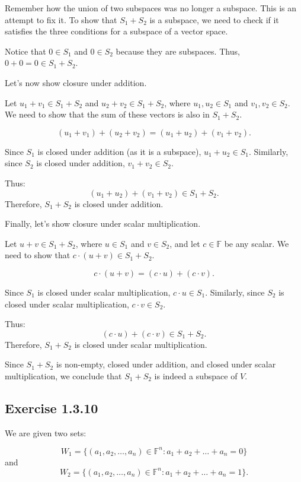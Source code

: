 \documentclass{article}
\theoremstyle{definition}
\begin{document}
Remember how the union of two subspaces was no longer a subspace. This is an attempt to fix it.
To show that \( S_1 + S_2 \) is a subspace, we need to check if it satisfies the three conditions for a subspace of a vector space.


Notice that $ 0 \in S_{1} $ and $ 0 \in S_{2} $ because they are subspaces. Thus, $ 0 + 0 = 0 \in S_{1} + S_{2} $.

Let's now show closure under addition.

Let \( u_1 + v_1 \in S_1 + S_2 \) and \( u_2 + v_2 \in S_1 + S_2 \), where \( u_1, u_2 \in S_1 \) and \( v_1, v_2 \in S_2 \). We need to show that the sum of these vectors is also in \( S_1 + S_2 \).

\[
(u_1 + v_1) + (u_2 + v_2) = (u_1 + u_2) + (v_1 + v_2).
\]

Since \( S_1 \) is closed under addition (as it is a subspace), \( u_1 + u_2 \in S_1 \). Similarly, since \( S_2 \) is closed under addition, \( v_1 + v_2 \in S_2 \).

Thus:
\[
(u_1 + u_2) + (v_1 + v_2) \in S_1 + S_2.
\]
Therefore, \( S_1 + S_2 \) is closed under addition.

Finally, let's show closure under scalar multiplication.

Let \( u + v \in S_1 + S_2 \), where \( u \in S_1 \) and \( v \in S_2 \), and let \( c \in \mathbb{F} \) be any scalar. We need to show that \( c \cdot (u + v) \in S_1 + S_2 \).

\[
c \cdot (u + v) = (c \cdot u) + (c \cdot v).
\]

Since \( S_1 \) is closed under scalar multiplication, \( c \cdot u \in S_1 \). Similarly, since \( S_2 \) is closed under scalar multiplication, \( c \cdot v \in S_2 \).

Thus:
\[
(c \cdot u) + (c \cdot v) \in S_1 + S_2.
\]
Therefore, \( S_1 + S_2 \) is closed under scalar multiplication.

Since \( S_1 + S_2 \) is non-empty, closed under addition, and closed under scalar multiplication, we conclude that \( S_1 + S_2 \) is indeed a subspace of \( V \).

\newpage

\subsection{Exercise 1.3.10}

We are given two sets:

\[
W_1 = \{ (a_1, a_2, \dots, a_n) \in \mathbb{F}^n : a_1 + a_2 + \dots + a_n = 0 \}
\]
and
\[
W_2 = \{ (a_1, a_2, \dots, a_n) \in \mathbb{F}^n : a_1 + a_2 + \dots + a_n = 1 \}.
\]
\end{document}
